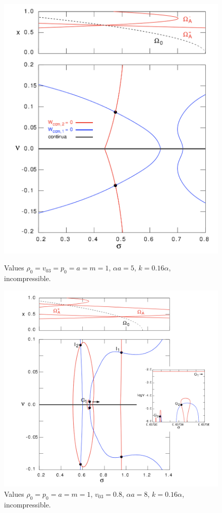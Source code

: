 \documentclass[12pt]{article}
\begin{document}
\begin{figure}[h]
	\centering
	\begin{minipage}{0.42\textwidth}
		\centering
		\includegraphics[width=\textwidth]{internal_kink.png}
		\caption{Values $\rho_0 = v_{03} = p_0 = a = m = 1$, $\alpha a = 5$, $k = 0.16\alpha$, incompressible.}
	\end{minipage}\hfill
	\begin{minipage}{0.53\textwidth}
		\centering
		\includegraphics[width=\textwidth]{internal_kink2.png}
		\caption{Values $\rho_0 = p_0 = a = m = 1$, $v_{03} = 0.8$, $\alpha a = 8$, $k = 0.16\alpha$, incompressible.}
	\end{minipage}
\end{figure}
\end{document}
